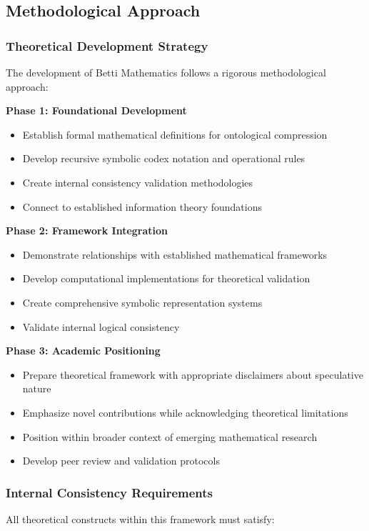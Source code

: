 \subsection{Methodological Approach}

\subsubsection{Theoretical Development Strategy}
The development of Betti Mathematics follows a rigorous methodological approach:

\textbf{Phase 1: Foundational Development}
\begin{itemize}
\item Establish formal mathematical definitions for ontological compression
\item Develop recursive symbolic codex notation and operational rules
\item Create internal consistency validation methodologies
\item Connect to established information theory foundations
\end{itemize}

\textbf{Phase 2: Framework Integration}
\begin{itemize}
\item Demonstrate relationships with established mathematical frameworks
\item Develop computational implementations for theoretical validation
\item Create comprehensive symbolic representation systems
\item Validate internal logical consistency
\end{itemize}

\textbf{Phase 3: Academic Positioning}
\begin{itemize}
\item Prepare theoretical framework with appropriate disclaimers about speculative nature
\item Emphasize novel contributions while acknowledging theoretical limitations
\item Position within broader context of emerging mathematical research
\item Develop peer review and validation protocols
\end{itemize}

\subsubsection{Internal Consistency Requirements}
All theoretical constructs within this framework must satisfy:

